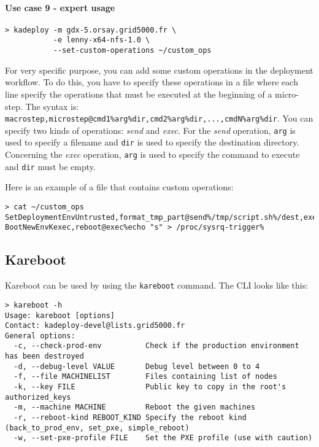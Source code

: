 \documentclass[a4wide,10pt,oneside]{book}
\begin{document}
\paragraph{Use case 9 - expert usage}
\begin{verbatim}
> kadeploy -m gdx-5.orsay.grid5000.fr \
           -e lenny-x64-nfs-1.0 \
           --set-custom-operations ~/custom_ops
\end{verbatim}
For very specific purpose, you can add some custom operations in the deployment workflow. To do this, you have to specify these operations in a file where each line specify the operations that must be executed at the beginning of a micro-step. The syntax is: \texttt{macrostep,microstep@cmd1\%arg\%dir,cmd2\%arg\%dir,...,cmdN\%arg\%dir}. You can specify two kinds of operations: \textit{send} and \textit{exec}. For the \textit{send} operation, \texttt{arg} is used to specify a filename and \texttt{dir} is used to specify the destination directory. Concerning the \textit{exec} operation, \texttt{arg} is used to specify the command to execute and \texttt{dir} must be empty.

Here is an example of a file that contains custom operations:
\begin{small}
\begin{verbatim}
> cat ~/custom_ops
SetDeploymentEnvUntrusted,format_tmp_part@send%/tmp/script.sh%/dest,exec%/dest/script.sh%
BootNewEnvKexec,reboot@exec%echo "s" > /proc/sysrq-trigger%
\end{verbatim}
\end{small}

\subsection{Kareboot}
Kareboot can be used by using the \texttt{kareboot} command. The CLI looks like this:
\begin{small}
\begin{verbatim}
> kareboot -h
Usage: kareboot [options]
Contact: kadeploy-devel@lists.grid5000.fr
General options:
  -c, --check-prod-env          Check if the production environment has been destroyed
  -d, --debug-level VALUE       Debug level between 0 to 4
  -f, --file MACHINELIST        Files containing list of nodes
  -k, --key FILE                Public key to copy in the root's authorized_keys
  -m, --machine MACHINE         Reboot the given machines
  -r, --reboot-kind REBOOT_KIND Specify the reboot kind (back_to_prod_env, set_pxe, simple_reboot)
  -w, --set-pxe-profile FILE    Set the PXE profile (use with caution)
\end{verbatim}
\end{small}
\end{document}
